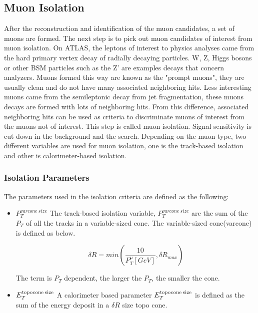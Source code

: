 \subsection{Muon Isolation}
After the reconstruction and identification of the muon candidates, a set of muons are formed. The next step is to pick out muon candidates of interest from muon isolation. On ATLAS, the leptons of interest to physics analyses came from the hard primary vertex decay of radially decaying particles. W, Z, Higgs bosons or other BSM particles such as the Z' are examples decays that concern analyzers. Muons formed this way are known as the "prompt muons", they are usually clean and do not have many
associated neighboring hits. Less interesting muons came from the semileptonic decay from jet fragmentation, these muons decays are formed with lots of neighboring hits. From this difference, associated neighboring hits can be used as criteria to discriminate muons of interest from the muons not of interest. This step is called muon isolation. Signal sensitivity is cut down in the background and the search. Depending on the muon type, two different variables are used for muon isolation, one is the track-based isolation and other is calorimeter-based isolation.

\subsubsection*{Isolation Parameters}
The parameters used in the isolation criteria are defined as the following:
\begin{itemize}
    \item  $P_{T}^{varcone\:size}$ \newline
        The track-based isolation variable, $P_{T}^{varcone\:size}$ are the sum of the $P_{T}$ of all the tracks in a variable-sized cone. The variable-sized cone(varcone) is defined as below.

    
\begin{equation}
 \delta R = min(\frac{10}{P^{\mu}_{T}[GeV]}, \delta R_{max}) 
 \end{equation}

The term is $P_{T}$ dependent, the larger the $P_{T}$, the smaller the cone. 
    \item $E^{\textrm{topocone\:size}}_{T}$ \newline
        A calorimeter based parameter $E^{\textrm{topocone\:size}}_T$ is defined as the sum of the energy deposit in a $\delta R$ size topo cone. 

\end{itemize}

